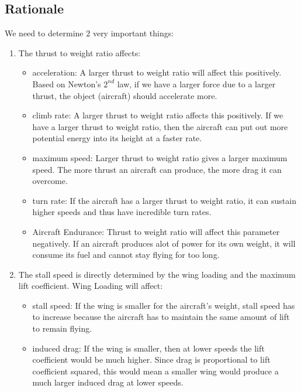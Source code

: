 \documentclass[letter, 12pt]{article}
\begin{document}
\maketitle
\newpage
\tableofcontents
\newpage
\begin{center}

\section{Rationale}
\begin{comment}
\end{comment}
We need to determine $2$ very important things:
\begin{enumerate}
\item The thrust to weight ratio affects:
\begin{itemize}
\item acceleration: A larger thrust to weight ratio will affect this positively. Based on Newton's $2^{nd}$ law, if we have a larger force due to a larger thrust, the object (aircraft) should accelerate more.
\item climb rate: A larger thrust to weight ratio affects this positively. If we have a larger thrust to weight ratio, then the aircraft can put out more potential energy into its height at a faster rate.
\item maximum speed: Larger thrust to weight ratio gives a larger maximum speed. The more thrust an aircraft can produce, the more drag it can overcome.
\item turn rate: If the aircraft has a larger thrust to weight ratio, it can sustain higher speeds and thus have incredible turn rates.
\item Aircraft Endurance: Thrust to weight ratio will affect this parameter negatively. If an aircraft produces alot of power for its own weight, it will consume its fuel and cannot stay flying for too long.
\end{itemize}
\item The stall speed is directly determined by the wing loading and the maximum lift coefficient. Wing Loading will affect:
\begin{itemize}
\item stall speed: If the wing is smaller for the aircraft's weight, stall speed has to increase because the aircraft has to maintain the same amount of lift to remain flying.
\item induced drag: If the wing is smaller, then at lower speeds the lift coefficient would be much higher. Since drag is proportional to lift coefficient squared, this would mean a smaller wing would produce a much larger induced drag at lower speeds.

\end{itemize}
\end{enumerate}
\end{center}
\end{document}
